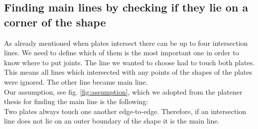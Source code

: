 \documentclass[../ClassicThesis.tex]{subfiles}
\begin{document}
\subsection{Finding main lines by checking if they lie on a corner of the shape}
As already mentioned when plates intersect there can be up to four intersection lines. We need to define which of them is the most important one in order to know where to put joints. The line we wanted to choose had to touch both plates.\\
This means all lines which intersected with any points of the shapes of the plates were ignored. The other line became main line.\\
Our assumption, see fig. \ref{fig:assumption}, which we adopted from the platener thesis \cite{master-thesis} for finding the main line is the following:\\
Two plates always touch one another edge-to-edge. Therefore, if an intersection line does not lie on an outer boundary of the shape it is the main line.
\end{document}
